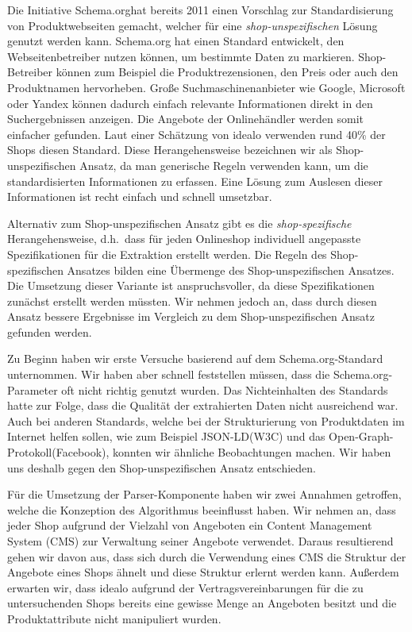 Die Initiative Schema.org\footnotemark hat bereits 2011 einen Vorschlag zur Standardisierung von Produktwebseiten
gemacht, welcher für eine \textit{shop-unspezifischen} Lösung genutzt werden kann.
Schema.org hat einen Standard entwickelt, den Webseitenbetreiber nutzen können, um bestimmte Daten zu markieren.
Shop-Betreiber können zum Beispiel die Produktrezensionen, den Preis oder auch den Produktnamen hervorheben.
Große Suchmaschinenanbieter wie Google, Microsoft oder Yandex können dadurch einfach relevante Informationen
direkt in den Suchergebnissen anzeigen.
Die Angebote der Onlinehändler werden somit einfacher gefunden.
Laut einer Schätzung von idealo verwenden rund 40\% der Shops diesen Standard.
Diese Herangehensweise bezeichnen wir als Shop-unspezifischen Ansatz, da man generische Regeln verwenden kann,
um die standardisierten Informationen zu erfassen.
Eine Lösung zum Auslesen dieser Informationen ist recht einfach und schnell umsetzbar.

Alternativ zum Shop-unspezifischen Ansatz gibt es die \textit{shop-spezifische} Herangehensweise, d.h.\ dass für jeden
Onlineshop individuell angepasste Spezifikationen für die Extraktion erstellt werden.
Die Regeln des Shop-spezifischen Ansatzes bilden eine Übermenge des Shop-unspezifischen Ansatzes.
Die Umsetzung dieser Variante ist anspruchsvoller, da diese Spezifikationen zunächst erstellt werden müssten.
Wir nehmen jedoch an, dass durch diesen Ansatz bessere Ergebnisse im Vergleich zu dem Shop-unspezifischen Ansatz
gefunden werden.

Zu Beginn haben wir erste Versuche basierend auf dem Schema.org-Standard unternommen.
Wir haben aber schnell feststellen müssen, dass die Schema.org-Parameter oft nicht richtig genutzt wurden.
Das Nichteinhalten des Standards hatte zur Folge, dass die Qualität der extrahierten Daten nicht ausreichend war.
Auch bei anderen Standards, welche bei der Strukturierung von Produktdaten im Internet helfen sollen, wie zum Beispiel
JSON-LD\footnotemark (W3C) und das Open-Graph-Protokoll\footnotemark (Facebook), konnten wir ähnliche Beobachtungen
machen.
%
%
Wir haben uns deshalb gegen den Shop-unspezifischen Ansatz entschieden.

Für die Umsetzung der Parser-Komponente haben wir zwei Annahmen getroffen, welche die Konzeption des Algorithmus
beeinflusst haben.
Wir nehmen an, dass jeder Shop aufgrund der Vielzahl von Angeboten ein Content Management System (CMS) zur Verwaltung
seiner Angebote verwendet.
Daraus resultierend gehen wir davon aus, dass sich durch die Verwendung eines CMS die Struktur der Angebote eines Shops
ähnelt und diese Struktur erlernt werden kann.
Außerdem erwarten wir, dass idealo aufgrund der Vertragsvereinbarungen für die zu untersuchenden Shops bereits
eine gewisse Menge an Angeboten besitzt und die Produktattribute nicht manipuliert wurden.

